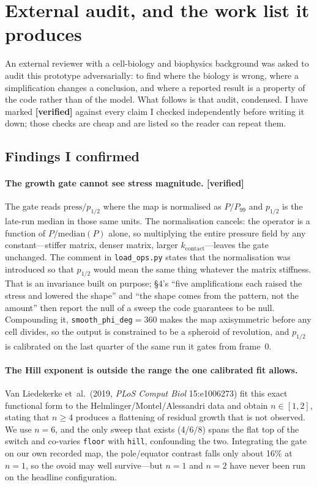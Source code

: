 \documentclass[10pt]{article}
\begin{document}
\section{External audit, and the work list it produces}

An external reviewer with a cell-biology and biophysics background was asked to audit this prototype
adversarially: to find where the biology is wrong, where a simplification changes a conclusion, and where
a reported result is a property of the code rather than of the model. What follows is that audit,
condensed. I have marked \textbf{[verified]} against every claim I checked independently before writing
it down; those checks are cheap and are listed so the reader can repeat them.

\subsection*{Findings I confirmed}

\paragraph{The growth gate cannot see stress magnitude. [verified]} The gate reads
$\mathrm{press}/p_{1/2}$ where the map is normalised as $P/P_{99}$ and $p_{1/2}$ is the late-run median in
those same units. The normalisation cancels: the operator is a function of $P/\mathrm{median}(P)$ alone,
so multiplying the entire pressure field by any constant---stiffer matrix, denser matrix, larger
$k_{\text{contact}}$---leaves the gate unchanged. The comment in \texttt{load\_ops.py} states that the
normalisation was introduced so that $p_{1/2}$ would mean the same thing whatever the matrix stiffness.
That is an invariance built on purpose; \S4's ``five amplifications each raised the stress and lowered the
shape'' and ``the shape comes from the pattern, not the amount'' then report the null of a sweep the code
guarantees to be null. Compounding it, \texttt{smooth\_phi\_deg}$=360$ makes the map axisymmetric before
any cell divides, so the output is constrained to be a spheroid of revolution, and $p_{1/2}$ is
calibrated on the last quarter of the same run it gates from frame~0.

\paragraph{The Hill exponent is outside the range the one calibrated fit allows.} Van Liedekerke
et~al.\ (2019, \emph{PLoS Comput Biol} 15:e1006273) fit this exact functional form to the
Helmlinger/Montel/Alessandri data and obtain $n\in[1,2]$, stating that $n\ge4$ produces a flattening of
residual growth that is not observed. We use $n=6$, and the only sweep that exists (4/6/8) spans the flat
top of the switch and co-varies \texttt{floor} with \texttt{hill}, confounding the two. Integrating the
gate on our own recorded map, the pole/equator contrast falls only about 16\% at $n=1$, so the ovoid may
well survive---but $n=1$ and $n=2$ have never been run on the headline configuration.
\end{document}
